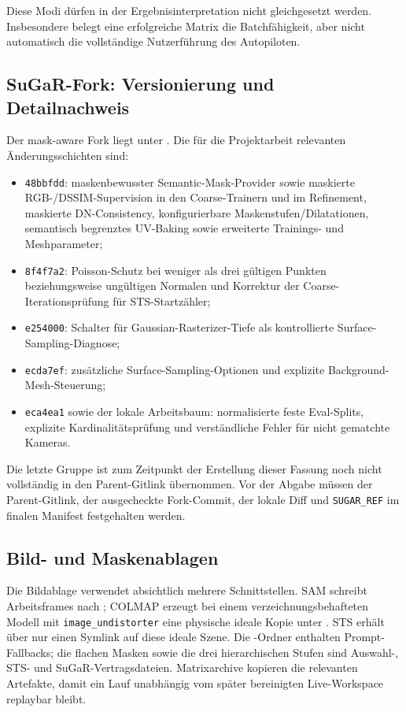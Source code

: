   Diese Modi dürfen in der Ergebnisinterpretation nicht gleichgesetzt werden.
  Insbesondere belegt eine erfolgreiche Matrix die Batchfähigkeit, aber nicht
  automatisch die vollständige Nutzerführung des Autopiloten.

  \subsection*{SuGaR-Fork: Versionierung und Detailnachweis}

  Der mask-aware Fork liegt unter . Die für die
  Projektarbeit relevanten Änderungsschichten sind:

  \begin{itemize}
    \item \texttt{48bbfdd}: maskenbewusster Semantic-Mask-Provider sowie
      maskierte RGB-/DSSIM-Supervision in den Coarse-Trainern und im Refinement,
      maskierte DN-Consistency, konfigurierbare Maskenstufen/Dilatationen,
      semantisch begrenztes UV-Baking sowie erweiterte Trainings- und
      Meshparameter;
    \item \texttt{8f4f7a2}: Poisson-Schutz bei weniger als drei gültigen Punkten
      beziehungsweise ungültigen Normalen und Korrektur der
      Coarse-Iterationsprüfung für STS-Startzähler;
    \item \texttt{e254000}: Schalter für Gaussian-Rasterizer-Tiefe als
      kontrollierte Surface-Sampling-Diagnose;
    \item \texttt{ecda7ef}: zusätzliche Surface-Sampling-Optionen und
      explizite Background-Mesh-Steuerung;
    \item \texttt{eca4ea1} sowie der lokale Arbeitsbaum: normalisierte feste
      Eval-Splits, explizite Kardinalitätsprüfung und verständliche Fehler
      für nicht gematchte Kameras.
  \end{itemize}

  Die letzte Gruppe ist zum Zeitpunkt der Erstellung dieser Fassung noch nicht
  vollständig in den Parent-Gitlink übernommen. Vor der Abgabe müssen der
  Parent-Gitlink, der ausgecheckte Fork-Commit, der lokale Diff und
  \texttt{SUGAR\_REF} im finalen Manifest festgehalten werden.

  \subsection*{Bild- und Maskenablagen}

  Die Bildablage verwendet absichtlich mehrere Schnittstellen. SAM schreibt
  Arbeitsframes nach ; COLMAP erzeugt bei einem
  verzeichnungsbehafteten Modell mit \texttt{image\_undistorter} eine physische
  ideale Kopie unter . STS erhält über
   nur einen Symlink auf diese ideale Szene. Die
  -Ordner enthalten Prompt-Fallbacks; die flachen
  Masken sowie die drei hierarchischen Stufen sind Auswahl-, STS- und
  SuGaR-Vertragsdateien. Matrixarchive kopieren die relevanten Artefakte, damit
  ein Lauf unabhängig vom später bereinigten Live-Workspace replaybar bleibt.

